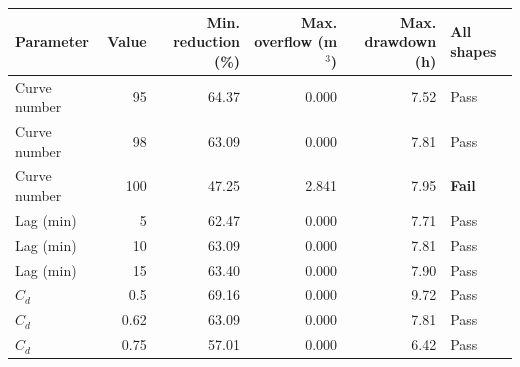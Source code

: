 \begin{tabular}{lrrrrl}
\toprule
Parameter & Value & \shortstack{Min. reduction\\(\%)} & \shortstack{Max. overflow\\(m$^3$)} & \shortstack{Max. drawdown\\(h)} & All shapes \\
\midrule
Curve number & 95 & 64.37 & 0.000 & 7.52 & Pass \\
Curve number & 98 & 63.09 & 0.000 & 7.81 & Pass \\
Curve number & 100 & 47.25 & 2.841 & 7.95 & \textbf{Fail} \\
Lag (min) & 5 & 62.47 & 0.000 & 7.71 & Pass \\
Lag (min) & 10 & 63.09 & 0.000 & 7.81 & Pass \\
Lag (min) & 15 & 63.40 & 0.000 & 7.90 & Pass \\
$C_d$ & 0.5 & 69.16 & 0.000 & 9.72 & Pass \\
$C_d$ & 0.62 & 63.09 & 0.000 & 7.81 & Pass \\
$C_d$ & 0.75 & 57.01 & 0.000 & 6.42 & Pass \\
\bottomrule
\end{tabular}
